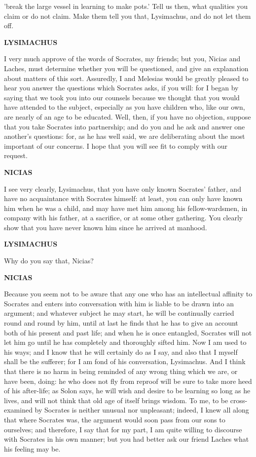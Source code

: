 \documentclass[11pt,letter]{book}
\begin{document}
'break the large vessel in learning to make pots.' Tell us then, what qualities you claim or do not claim. Make them tell you that, Lysimachus, and do not let them off.

\par \textbf{LYSIMACHUS}
\par   I very much approve of the words of Socrates, my friends; but you, Nicias and Laches, must determine whether you will be questioned, and give an explanation about matters of this sort. Assuredly, I and Melesias would be greatly pleased to hear you answer the questions which Socrates asks, if you will:  for I began by saying that we took you into our counsels because we thought that you would have attended to the subject, especially as you have children who, like our own, are nearly of an age to be educated. Well, then, if you have no objection, suppose that you take Socrates into partnership; and do you and he ask and answer one another's questions:  for, as he has well said, we are deliberating about the most important of our concerns. I hope that you will see fit to comply with our request.

\par \textbf{NICIAS}
\par   I see very clearly, Lysimachus, that you have only known Socrates' father, and have no acquaintance with Socrates himself:  at least, you can only have known him when he was a child, and may have met him among his fellow-wardsmen, in company with his father, at a sacrifice, or at some other gathering. You clearly show that you have never known him since he arrived at manhood.

\par \textbf{LYSIMACHUS}
\par   Why do you say that, Nicias?

\par \textbf{NICIAS}
\par   Because you seem not to be aware that any one who has an intellectual affinity to Socrates and enters into conversation with him is liable to be drawn into an argument; and whatever subject he may start, he will be continually carried round and round by him, until at last he finds that he has to give an account both of his present and past life; and when he is once entangled, Socrates will not let him go until he has completely and thoroughly sifted him. Now I am used to his ways; and I know that he will certainly do as I say, and also that I myself shall be the sufferer; for I am fond of his conversation, Lysimachus. And I think that there is no harm in being reminded of any wrong thing which we are, or have been, doing:  he who does not fly from reproof will be sure to take more heed of his after-life; as Solon says, he will wish and desire to be learning so long as he lives, and will not think that old age of itself brings wisdom. To me, to be cross-examined by Socrates is neither unusual nor unpleasant; indeed, I knew all along that where Socrates was, the argument would soon pass from our sons to ourselves; and therefore, I say that for my part, I am quite willing to discourse with Socrates in his own manner; but you had better ask our friend Laches what his feeling may be.
\end{document}
